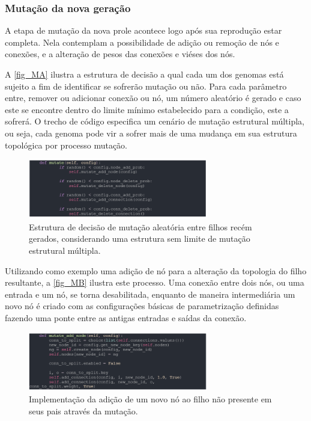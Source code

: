 \subsubsection{Mutação da nova geração}
A etapa de mutação da nova prole acontece logo após sua reprodução estar completa. Nela contemplam a
possibilidade de adição ou remoção de nós e conexões, e a alteração de pesos das conexões e viéses dos nós.

A \autoref{fig_MA} ilustra a estrutura de decisão a qual cada um dos genomas está sujeito a fim de
identificar se sofrerão mutação ou não. Para cada parâmetro entre, remover ou adicionar conexão ou nó,
um número aleatório é gerado e caso este se encontre dentro do limite mínimo estabelecido para a condição,
este a sofrerá. O trecho de código especifica um cenário de mutação estrutural múltipla, ou seja,
cada genoma pode vir a sofrer mais de uma mudança em sua estrutura topológica por processo mutação.

\begin{figure}[htb]
        \centering
        \caption{\label{fig_MA}Estrutura de decisão de mutação aleatória entre filhos recém gerados, considerando uma estrutura sem limite de mutação estrutural múltipla.}
        \includegraphics[width=0.7\textwidth]{images/MA.png}
\end{figure}

Utilizando como exemplo uma adição de nó para a alteração da topologia do
filho resultante, a \autoref{fig_MB} ilustra este processo. Uma conexão entre dois nós,
ou uma entrada e um nó, se torna desabilitada, enquanto de maneira intermediária um novo
nó é criado com as configurações básicas de parametrização definidas fazendo uma ponte
entre as antigas entradas e saídas da conexão.

\begin{figure}[htb]
        \centering
        \caption{\label{fig_MB}Implementação da adição de um novo nó ao filho não presente em seus pais através da mutação.}
        \includegraphics[width=0.7\textwidth]{images/MB.png}
\end{figure}

